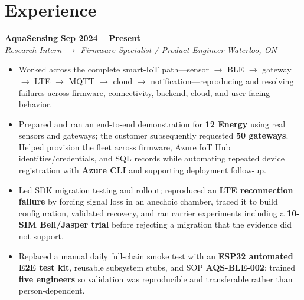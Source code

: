 \documentclass[letterpaper,10pt]{article}
\newcommand{\role}[4]{\textbf{#1} \hfill \textbf{#2} \\
\textit{#3} \hfill \textit{#4} \\
}
\newcommand{\tight}{\vspace{-2pt}}
\begin{document}
\section{Experience}
\role{AquaSensing}{Sep 2024 -- Present}{Research Intern $\rightarrow$ Firmware Specialist / Product Engineer}{Waterloo, ON}
\begin{itemize}
  \item Worked across the complete smart-IoT path---sensor $\rightarrow$ BLE $\rightarrow$ gateway $\rightarrow$ LTE $\rightarrow$ MQTT $\rightarrow$ cloud $\rightarrow$ notification---reproducing and resolving failures across firmware, connectivity, backend, cloud, and user-facing behavior.
  \item Prepared and ran an end-to-end demonstration for \textbf{12 Energy} using real sensors and gateways; the customer subsequently requested \textbf{50 gateways}. Helped provision the fleet across firmware, Azure IoT Hub identities/credentials, and SQL records while automating repeated device registration with \textbf{Azure CLI} and supporting deployment follow-up.
  \item Led SDK migration testing and rollout; reproduced an \textbf{LTE reconnection failure} by forcing signal loss in an anechoic chamber, traced it to build configuration, validated recovery, and ran carrier experiments including a \textbf{10-SIM Bell/Jasper trial} before rejecting a migration that the evidence did not support.
  \item Replaced a manual daily full-chain smoke test with an \textbf{ESP32 automated E2E test kit}, reusable subsystem stubs, and SOP \textbf{AQS-BLE-002}; trained \textbf{five engineers} so validation was reproducible and transferable rather than person-dependent.
\end{itemize}
\tight
\end{document}
